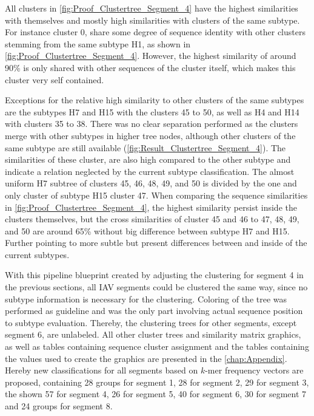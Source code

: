 All clusters in \autoref{fig:Proof_Clustertree_Segment_4} have the highest similarities with themselves and mostly high similarities with clusters of the same subtype. For instance cluster 0, share some degree of sequence identity with other clusters stemming from the same subtype H1, as shown in \autoref{fig:Proof_Clustertree_Segment_4}. However, the highest similarity of around 90\% is only shared with other sequences of the cluster itself, which makes this cluster very self contained. 

\vspace{1em}

Exceptions for the relative high similarity to other clusters of the same subtypes are the subtypes H7 and H15 with the clusters 45 to 50, as well as H4 and H14 with clusters 35 to 38. There was no clear separation performed as the clusters merge with other subtypes in higher tree nodes, although other clusters of the same subtype are still available (\autoref{fig:Result_Clustertree_Segment_4}). The similarities of these cluster, are also high compared to the other subtype and indicate a relation neglected by the current subtype classification. The almost uniform H7 subtree of clusters 45, 46, 48, 49, and 50 is divided by the one and only cluster of subtype H15 cluster 47. When comparing the sequence similarities in \autoref{fig:Proof_Clustertree_Segment_4}, the highest similarity persist inside the clusters themselves, but the cross similarities of cluster 45 and 46 to 47, 48, 49, and 50 are around 65\% without big difference between subtype H7 and H15. Further pointing to more subtle but present differences between and inside of the current subtypes. 

\vspace{1em}

With this pipeline blueprint created by adjusting the clustering for segment 4 in the previous sections, all \gls{IAV} segments could be clustered the same way, since no subtype information is necessary for the clustering. Coloring of the tree was performed as guideline and was the only part involving actual sequence position to subtype evaluation. Thereby, the clustering trees for other segments, except segment 6, are unlabeled. All other cluster trees and similarity matrix graphics, as well as tables containing sequence cluster assignment and the tables containing the values used to create the graphics are presented in the \autoref{chap:Appendix}. Hereby new classifications for all segments based on $k$-mer frequency vectors are proposed, containing 28 groups for segment 1, 28 for segment 2, 29 for segment 3, the shown 57 for segment 4, 26 for segment 5, 40 for segment 6, 30 for segment 7 and 24 groups for segment 8. 

